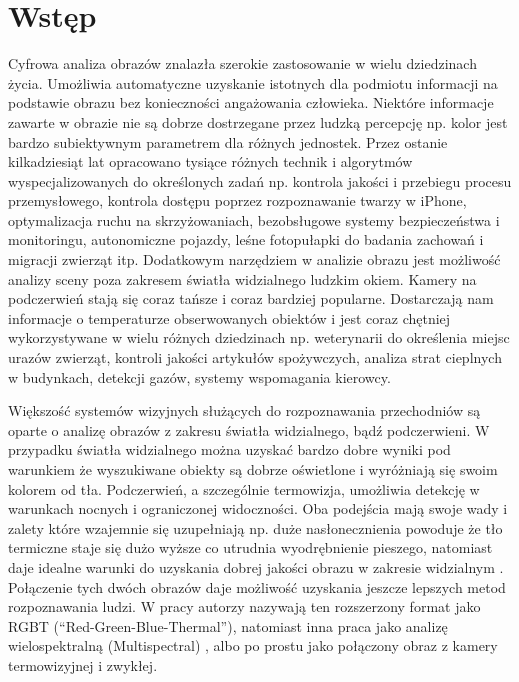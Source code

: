 \chapter{Wstęp}
\label{cha:wstep}

Cyfrowa analiza obrazów znalazła szerokie zastosowanie w wielu dziedzinach życia. Umożliwia automatyczne uzyskanie istotnych dla podmiotu informacji na podstawie obrazu bez konieczności angażowania człowieka. Niektóre informacje zawarte w obrazie nie są dobrze dostrzegane przez ludzką percepcję np. kolor jest bardzo subiektywnym parametrem dla różnych jednostek. Przez ostanie kilkadziesiąt lat opracowano tysiące różnych technik i algorytmów wyspecjalizowanych do określonych zadań np. kontrola jakości i przebiegu procesu przemysłowego, kontrola dostępu poprzez rozpoznawanie twarzy w iPhone, optymalizacja ruchu na skrzyżowaniach, bezobsługowe systemy bezpieczeństwa i monitoringu, autonomiczne pojazdy, leśne fotopułapki do badania zachowań i migracji zwierząt itp.  Dodatkowym narzędziem w analizie obrazu jest możliwość analizy sceny poza zakresem światła widzialnego ludzkim okiem. Kamery na podczerwień stają się coraz tańsze i coraz bardziej popularne. Dostarczają nam informacje o temperaturze obserwowanych obiektów i jest coraz chętniej wykorzystywane w wielu różnych dziedzinach np. weterynarii do określenia miejsc urazów zwierząt, kontroli jakości artykułów spożywczych, analiza strat cieplnych w budynkach, detekcji gazów, systemy wspomagania kierowcy\cite{gade2014thermal}. 

Większość systemów wizyjnych służących do rozpoznawania przechodniów są oparte o analizę obrazów z zakresu światła widzialnego, bądź podczerwieni. W przypadku światła widzialnego można uzyskać bardzo dobre wyniki pod warunkiem że wyszukiwane obiekty są dobrze oświetlone i wyróżniają się swoim kolorem od tła. Podczerwień, a szczególnie termowizja, umożliwia detekcję w warunkach nocnych i ograniczonej widoczności. Oba podejścia mają swoje wady i zalety które wzajemnie się uzupełniają np. duże nasłonecznienia powoduje że tło termiczne staje się dużo wyższe co utrudnia wyodrębnienie pieszego, natomiast daje idealne warunki do uzyskania dobrej jakości obrazu w zakresie widzialnym \cite{lee2015robust}. Połączenie tych dwóch obrazów daje możliwość uzyskania jeszcze lepszych metod rozpoznawania ludzi. W pracy \cite{st2007combination} autorzy nazywają ten rozszerzony format jako RGBT (“Red-Green-Blue-Thermal”), natomiast inna praca jako analizę wielospektralną (Multispectral) \cite{hwang2015multispectral}, albo po prostu jako połączony obraz z kamery termowizyjnej i zwykłej\cite{lee2015robust}. 

